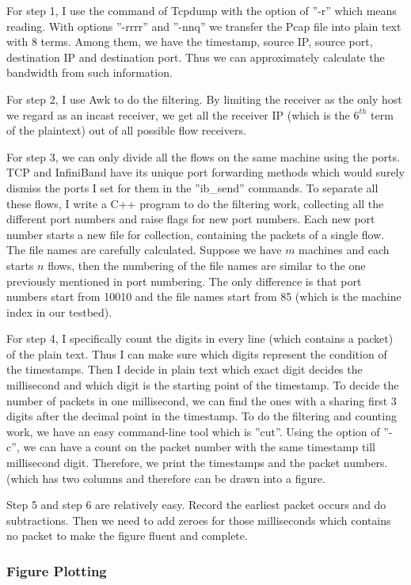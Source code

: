 \documentclass[12pt,a4paper]{article}
\begin{document}
For step 1, I use the command of Tcpdump with the option of ''-r'' which means reading.
With options ''-rrrr'' and ''-nnq'' we transfer the Pcap file into plain text with 8 terms.
Among them, we have the timestamp, source IP, source port, destination IP and destination port.
Thus we can approximately calculate the bandwidth from such information.

For step 2, I use Awk to do the filtering. By limiting the receiver as the only host we regard as an incast receiver, we get all the receiver IP (which is the
$6^{th}$ term of the plaintext) out of all possible flow receivers.

For step 3, we can only divide all the flows on the same machine using the ports.
TCP and InfiniBand have its unique port forwarding methods which would surely dismiss the ports I set for them in the ''ib\_send'' commands.
To separate all these flows, I write a C++ program to do the filtering work, collecting all the different port numbers and raise flags for new port numbers.
Each new port number starts a new file for collection, containing the packets of a single flow.
The file names are carefully calculated.
Suppose we have $m$ machines and each starts $n$ flows, then the numbering of the file names are similar to the one previously mentioned in port numbering.
The only difference is that port numbers start from 10010 and the file names start from 85 (which is the machine index in our testbed).

For step 4, I specifically count the digits in every line (which contains a packet) of the plain text. Thus I can make sure which digits represent the condition
of the timestamps. 
Then I decide in plain text which exact digit decides the millisecond and which digit is the starting point of the timestamp.
To decide the number of packets in one millisecond, we can find the ones with a sharing first 3 digits after the decimal point in the timestamp.
To do the filtering and counting work, we have an easy command-line tool which is ''cut''.
Using the option of ''-c'', we can have a count on the packet number with the same timestamp till millisecond digit.
Therefore, we print the timestamps and the packet numbers. (which has two columns and therefore can be drawn into a figure.

Step 5 and step 6 are relatively easy. 
Record the earliest packet occurs and do subtractions.
Then we need to add zeroes for those milliseconds which contains no packet to make the figure fluent and complete.

\subsubsection{Figure Plotting}
\end{document}
